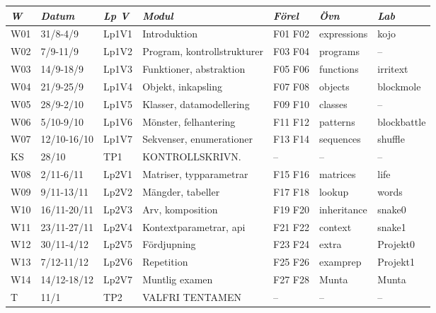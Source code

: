 \begin{tabular}{l|l|l|l|l|l|l}
\textit{W} & \textit{Datum} & \textit{Lp V} & \textit{Modul} & \textit{Förel} & \textit{Övn} & \textit{Lab} \\ \hline \hline
W01 & 31/8-4/9 & Lp1V1 & Introduktion & F01 F02 & expressions & kojo \\
W02 & 7/9-11/9 & Lp1V2 & Program, kontrollstrukturer & F03 F04 & programs & -- \\
W03 & 14/9-18/9 & Lp1V3 & Funktioner, abstraktion & F05 F06 & functions & irritext \\
W04 & 21/9-25/9 & Lp1V4 & Objekt, inkapsling & F07 F08 & objects & blockmole \\
W05 & 28/9-2/10 & Lp1V5 & Klasser, datamodellering & F09 F10 & classes & -- \\
W06 & 5/10-9/10 & Lp1V6 & Mönster, felhantering & F11 F12 & patterns & blockbattle \\
W07 & 12/10-16/10 & Lp1V7 & Sekvenser, enumerationer & F13 F14 & sequences & shuffle \\
KS & 28/10 & TP1 & KONTROLLSKRIVN. & -- & -- & -- \\
W08 & 2/11-6/11 & Lp2V1 & Matriser, typparametrar & F15 F16 & matrices & life \\
W09 & 9/11-13/11 & Lp2V2 & Mängder, tabeller & F17 F18 & lookup & words \\
W10 & 16/11-20/11 & Lp2V3 & Arv, komposition & F19 F20 & inheritance & snake0 \\
W11 & 23/11-27/11 & Lp2V4 & Kontextparametrar, api & F21 F22 & context & snake1 \\
W12 & 30/11-4/12 & Lp2V5 & Fördjupning & F23 F24 & extra & Projekt0 \\
W13 & 7/12-11/12 & Lp2V6 & Repetition & F25 F26 & examprep & Projekt1 \\
W14 & 14/12-18/12 & Lp2V7 & Muntlig examen & F27 F28 & Munta & Munta \\
T & 11/1 & TP2 & VALFRI TENTAMEN & -- & -- & -- \\
\end{tabular}
